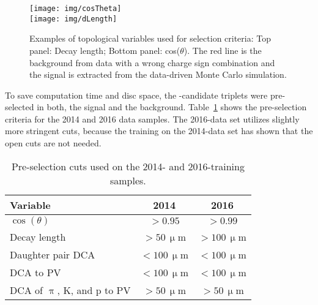 \begin{figure}[!htb]
\centering
\texttt{[image: img/cosTheta]}\\[1cm]
\texttt{[image: img/dLength]}
\caption[Examples of topological variables used for selection criteria.]{\label{fig:optimization}Examples of topological variables used for selection criteria: Top panel: Decay length; Bottom panel: cos($\theta$)\@. The red line is the background from data with a wrong charge sign combination and the signal is extracted from the data-driven Monte Carlo simulation.}

\end{figure}

To save computation time and disc space, the \Lambdac-candidate triplets were pre-selected in both, the signal and the background. Table~\ref{tab:preoptimizationCuts} shows the pre-selection criteria for the 2014 and 2016 data samples. The 2016-data set utilizes slightly more stringent cuts, because the training on the 2014-data set has shown that the open cuts are not needed.

\begin{table}[!htb]
\caption[Pre-selection cuts used on the 2014- and 2016-training samples.]{\label{tab:preoptimizationCuts} Pre-selection cuts used on the 2014- and 2016-training samples. }
\begin{center}

\begin{tabular}{lcc}
\toprule
Variable & 2014 & 2016 \\
\midrule
$\cos(\theta)$ & $> 0.95$ & $> 0.99$ \\
Decay length & $> 50\,\upmu$m & $> 100\,\upmu$m \\
Daughter pair DCA & $< 100\,\upmu$m & $< 100\,\upmu$m \\
DCA to PV & $< 100\,\upmu$m &  $< 100\,\upmu$m \\
DCA of $\uppi$, K, and p to PV & $> 50\,\upmu$m & $> 50\,\upmu$m \\
\bottomrule
\end{tabular}

\end{center}
\end{table}

